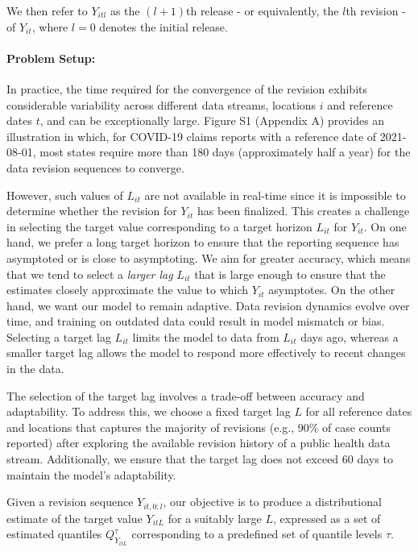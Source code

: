 We then refer to \( Y_{itl} \) as the \((l+1)\)th release - or equivalently, the \(l\)th revision - of \( Y_{it} \), where \( l = 0 \) denotes the initial release.



\paragraph{Problem Setup:}
In practice, the time required for the convergence of the revision exhibits considerable variability across different data streams, locations $i$ and reference dates $t$, and can be exceptionally large. Figure S1 (Appendix A) provides an illustration in which, for COVID-19 claims reports with a reference date of 2021-08-01, most states require more than 180 days (approximately half a year) for the data revision sequences to converge. 

However, such values of \( L_{it} \) are not available in real-time since it is impossible to determine whether the revision for \( Y_{it} \) has been finalized. This creates a challenge in selecting the target value corresponding to a target horizon \( L_{it} \) for \( Y_{it} \). On one hand, we prefer a long target horizon to ensure that the reporting sequence has asymptoted or is close to asymptoting. We aim for greater accuracy, which means that we tend to select a \emph{larger lag} \( L_{it} \) that is large enough to ensure that the estimates closely approximate the value to which \( Y_{it} \) asymptotes. On the other hand, we want our model to remain adaptive. Data revision dynamics evolve over time, and training on outdated data could result in model mismatch or bias. Selecting a target lag \( L_{it} \) limits the model to data from \( L_{it} \) days ago, whereas a smaller target lag allows the model to respond more effectively to recent changes in the data.

The selection of the target lag involves a trade-off between accuracy and adaptability. To address this, we choose a fixed target lag \( L \) for all reference dates and locations that captures the majority of revisions (e.g., 90\% of case counts reported) after exploring the available revision history of a public health data stream. Additionally, we ensure that the target lag does not exceed 60 days to maintain the model's adaptability.

Given a revision sequence \( Y_{it, 0:l} \), our objective is to produce a distributional estimate of the target value \( Y_{itL} \) for a suitably large \( L \), expressed as a set of estimated quantiles \( Q_{Y_{itL}}^{\tau} \) corresponding to a predefined set of quantile levels \( \tau \).









